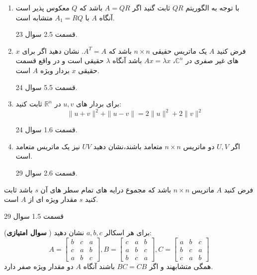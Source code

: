 \documentclass{article}
\begin{document}
\begin{enumerate}
		نشان دهید 
		$A$
		و 
		$A^{T}$
		جند جمله ای سرشت نمای مشابه ای دارند.
		\begin{حل}
			قسمت 2.5 سوال 20.
		\end{حل}
		\item 
		با توجه به الگوریتم 
		$QR$
		ثابت گنید اگر 
		$A=QR$
		باشد که 
		$Q$
		معکوس پذیر است آنگاه 
		$A$
		با 
		$A_1=RQ$
		متشابه است.
		\begin{حل}
			قسمت 2.5 سوال 23.
		\end{حل}
		\item 
		فرض کنید 
		$A$
		یک ماتریس حقیقی 
		$n\times n$
		باشد که 
		$A^T=A$.
		نشان دهید اگر برای 
		$x$
		های غیر صفری در 
		$\mathbb{C}^n$،
		$Ax=\lambda x$
		باشد آنگاه 
		$\lambda$
		حقیقی است و در واقع قسمت حقیقی 
		$x$
		بردار ویژه 
		$A$
		است.
		\begin{حل}
			قسمت 5.5 سوال 24.
		\end{حل}
		\item 
		برای بردار های 
		$u,v$
		در 
		$\mathbb{R}^n$
		ثابت کنید:
		$$\parallel u+v\parallel ^2 +\parallel u-v \parallel=2\parallel u\parallel^2+2\parallel v\parallel^2$$
		\begin{حل}
			قسمت 1.6 سوال 24.
		\end{حل}
		\item
		اگر 
		$U,V$
		دو ماتریس 
		$n\times n$
		متعامد باشند،نشان دهید 
		$UV$
		نیز یک ماتریس متعامد است.
		\begin{حل}
			قسمت 2.6 سوال 29.
		\end{حل}
	\end{enumerate}
	
	
	فرض کنید 
	$A$
	ماتریس 
	$n\times n$
	باشد که مجموع درایه های تمام سطر های آن
	$s$
	باشد ثابت کنید 
	$s$
	مقدار ویژه ای از 
	$A$
	است.
	\begin{حل}
		قسمت 1.5 سوال 29
	\end{حل}
	
	({\bf سوال امتیازی })
	برای هر اسکالر 
	$a,b,c$
	نشان دهید:
	$$A=\begin{bmatrix}
	b&c&a\\
	c&a&b\\
	a&b&c
	
	\end{bmatrix},
	B=\begin{bmatrix}
	c&a&b\\
	a&b&c\\
	b&c&a
	
	\end{bmatrix}
	,C=
	\begin{bmatrix}
	a&b&c\\
	b&c&a\\
	c&a&b
	\end{bmatrix}
	$$
	همگی متشابهند و اگر
	$BC=CB$
	باشند آنگاه 
	$A$
	دو مقدار ویژه صفر دارد.
	
\end{document}
